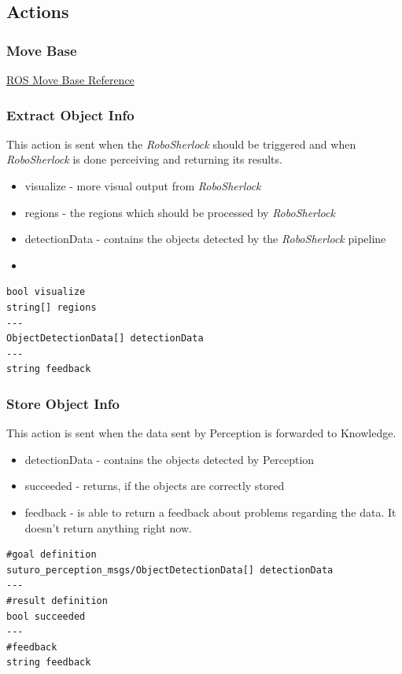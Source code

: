\documentclass[main.tex]{subfiles}
\begin{document}
				\subsection{Actions}
				\label{actions}
					\subsubsection{Move Base}
					\label{msg_move_base}
						\href{http://wiki.ros.org/move_base_msgs/MoveBaseAction}{ROS Move Base Reference}
					\subsubsection{Extract Object Info}
					\label{msg_extract_object_info}
						This action is sent when the \textit{RoboSherlock} should be triggered and when \textit{RoboSherlock} is done perceiving and returning its results.
					\begin{itemize}
						\item visualize - more visual output from \textit{RoboSherlock}
						\item regions - the regions which should be processed by \textit{RoboSherlock}
						\item detectionData - contains the objects detected by the \textit{RoboSherlock} pipeline
						\item
					\end{itemize}
					\begin{lstlisting}
bool visualize
string[] regions
---
ObjectDetectionData[] detectionData
---
string feedback
\end{lstlisting}
					\subsubsection{Store Object Info}
					\label{msg_store_object_info}
						This action is sent when the data sent by Perception is forwarded to Knowledge.
						\begin{itemize}
						\item detectionData - contains the objects detected by Perception
						\item succeeded - returns, if the objects are correctly stored
						\item feedback - is able to return a feedback about problems regarding the data. It doesn't return anything right now.
						\end{itemize}
						\begin{lstlisting}
#goal definition
suturo_perception_msgs/ObjectDetectionData[] detectionData
---
#result definition
bool succeeded
---
#feedback
string feedback
\end{lstlisting}
\end{document}
